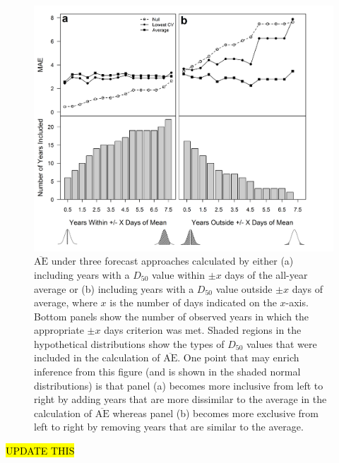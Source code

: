 \documentclass[12pt,]{book}
\theoremstyle{definition}
\theoremstyle{definition}
\theoremstyle{definition}
\theoremstyle{remark}
\begin{document}
\begin{figure}
  \centering
  \includegraphics{img/Ch2/mae-subsets.png}
  \caption{$\overline{\text{AE}}$ under three forecast approaches calculated by either (a) including years with a $D_{50}$ value within $\pm x$  days of the all-year average or (b) including years with a $D_{50}$ value outside $\pm x$ days of average, where $x$ is the number of days indicated on the $x$-axis. Bottom panels show the number of observed years in which the appropriate $\pm x$ days criterion was met. Shaded regions in the hypothetical distributions show the types of $D_{50}$ values that were included in the calculation of $\overline{\text{AE}}$. One point that may enrich inference from this figure (and is shown in the shaded normal distributions) is that panel (a) becomes more inclusive from left to right by adding years that are more dissimilar to the average in the calculation of $\overline{\text{AE}}$ whereas panel (b) becomes more exclusive from left to right by removing years that are similar to the average.}
  \label{fig:mae-subsets}
\end{figure}

\clearpage

\hl{UPDATE THIS}
\end{document}
